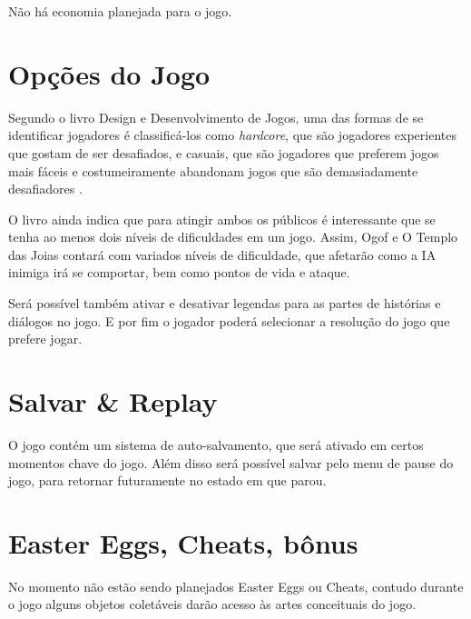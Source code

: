 Não há economia planejada para o jogo.

\section{Opções do Jogo}

Segundo o livro Design e Desenvolvimento de Jogos, uma das formas de se identificar jogadores é classificá-los como \textit{hardcore}, que são jogadores experientes que gostam de ser desafiados, e casuais, que são jogadores que preferem jogos mais fáceis e costumeiramente abandonam jogos que são demasiadamente desafiadores \cite{pradadesign}. 

O livro ainda indica que para atingir ambos os públicos é interessante que se tenha ao menos dois níveis de dificuldades em um jogo. Assim, Ogof e O Templo das Joias contará com variados níveis de dificuldade, que afetarão como a IA inimiga irá se comportar, bem como pontos de vida e ataque.

Será possível também ativar e desativar legendas para as partes de histórias e diálogos no jogo. E por fim o jogador poderá selecionar a resolução do jogo que prefere jogar.

\section{Salvar \& Replay}

O jogo contém um sistema de auto-salvamento, que será ativado em certos momentos chave do jogo. Além disso será possível salvar pelo menu de pause do jogo, para retornar futuramente no estado em que parou.

\section{Easter Eggs, Cheats, bônus}

No momento não estão sendo planejados Easter Eggs ou Cheats, contudo durante o jogo alguns objetos coletáveis darão acesso às artes conceituais do jogo.
